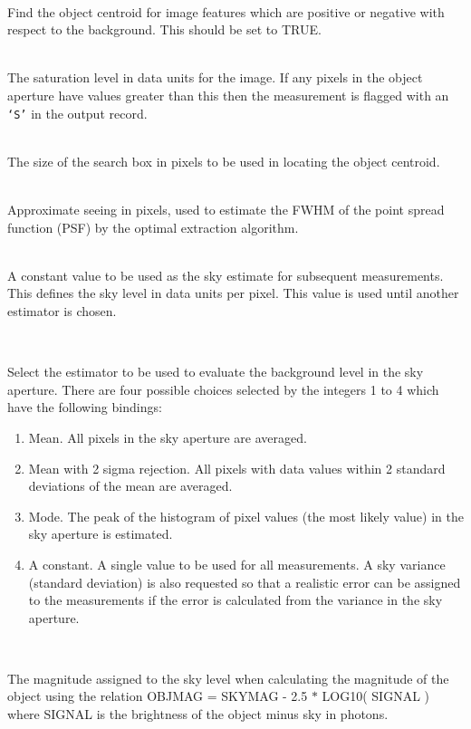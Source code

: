 \documentclass[twoside,11pt]{article}
\renewcommand{\_}{\texttt{\symbol{95}}}
\newcommand{\st}[1]{\texttt{`#1'}}
\newcommand{\sstsubsection}[1]{ \item[{#1}] \mbox{} \\}
\newcommand{\sstsubsection}[1]{\item[{#1}]}
\begin{document}
{{{\begin{enumerate}
         \end{enumerate}
      }
      \sstsubsection{
         POSITIVE = \_LOGICAL (Read)
      }{
         Find the object centroid for image features which are positive
         or negative with respect to the background. This should be set
         to TRUE.
      }
      \sstsubsection{
         SATURE = \_REAL (Read)
      }{
         The saturation level in data units for the image. If any pixels
         in the object aperture have values greater than this then the
         measurement is flagged with an \st{S} in the output record.
      }
      \sstsubsection{
         SEARCH = \_INTEGER (Read)
      }{
         The size of the search box in pixels to be used in locating the
         object centroid.
      }
      \sstsubsection{
         SEE = \_REAL (Read)
      }{
         Approximate seeing in pixels, used to estimate the FWHM of the
         point spread function (PSF) by the optimal extraction algorithm.
      }                      
      \sstsubsection{
         SKY = \_REAL (Read)
      }{
         A constant value to be used as the sky estimate for subsequent
         measurements. This defines the sky level in data units per
         pixel. This value is used until another estimator is chosen.
      }
      \sstsubsection{
         SKYEST = \_INTEGER (Read)
      }{
         Select the estimator to be used to evaluate the background
         level in the sky aperture. There are four possible choices
         selected by the integers 1 to 4 which have the following
         bindings:
         \begin{enumerate}
         \item  Mean. All pixels in the sky aperture are averaged.
         \item Mean with 2 sigma rejection. All pixels with data values
             within 2 standard deviations of the mean are averaged.
         \item Mode. The peak of the histogram of pixel values (the most
             likely value) in the sky aperture is estimated.
         \item A constant. A single value to be used for all
            measurements. A sky variance (standard deviation) is
            also requested so that a realistic error can be assigned
            to the measurements if the error is calculated from the
            variance in the sky aperture.
        \end{enumerate}
      }
      \sstsubsection{
         SKYMAG = \_REAL (Read)
      }{
         The magnitude assigned to the sky level when calculating the
         magnitude of the object using the relation
         OBJMAG = SKYMAG - 2.5 $*$ LOG10( SIGNAL )
         where SIGNAL is the brightness of the object minus sky in
         photons.

}}}
\end{document}

